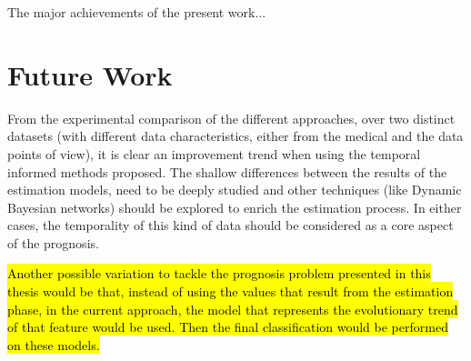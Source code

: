 The major achievements of the present work...


\section{Future Work}
\label{section:future}

From the experimental comparison of the different approaches, over two distinct datasets (with different data characteristics,
 either from the medical and the data points of view), it is clear an improvement trend when using the temporal informed
 methods proposed. The shallow differences between the results of the estimation models, need to be deeply studied and other
 techniques (like Dynamic Bayesian networks) should be explored to enrich the estimation process. In either cases,
 the temporality of this kind of data should be considered as a core aspect of the prognosis.
 
\hl{Another possible variation to tackle the prognosis problem presented in this thesis would be that, instead of using the 
values that result from the estimation phase, in the current approach, the model that represents the evolutionary trend of that
 feature would be used. Then the final classification would be performed on these models.}

\cleardoublepage

